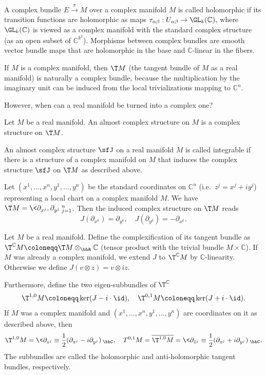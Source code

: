 \begin{defn}
    A complex bundle $E\overset\pi\to M$ over a complex manifold $M$ is called holomorphic if its transition functions are holomorphic as maps $\tau_{\alpha\beta}:U_{\alpha\beta}\to \GL_k(\mathbb{C})$, where $\GL_k(\mathbb{C})$ is viewed as a complex manifold with the standard complex structure (as an open subset of $\mathbb{C}^{k^2}$). Morphisms between complex bundles are smooth vector bundle maps that are holomorphic in the base and $\mathbb{C}$-linear in the fibers.
\end{defn}

If $M$ is a complex manifold, then $\T M$ (the tangent bundle of $M$ as a real manifold) is naturally a complex bundle, because the multiplication by the imaginary unit can be induced from the local trivializations mapping to $\mathbb{C}^n$.

However, when can a real manifold be turned into a complex one?

\begin{defn}
    Let $M$ be a real manifold. An almost complex structure on $M$ is a complex structure on $\T M$.
\end{defn}

\begin{defn}
    An almost complex structure $\sfJ$ on a real manifold $M$ is called integrable if there is a structure of a complex manifold on $M$ that induces the complex structure $\sfJ$ on $\T M$ as described above.
\end{defn}

Let $(x^1,\ldots,x^n,y^1,\ldots,y^n)$ be the standard coordinates on $\mathbb{C}^n$ (i.e.\ $z^j=x^j+iy^j$) representing a local chart on a complex manifold $M$. We have $\T M=\<\partial_{x^j},\partial_{y^j}\>_{j=1}^n$. Then the induced complex structure on $\T M$ reads 
\[J(\partial_{x^k})=\partial_{y^k},\quad J(\partial_{y^k})=-\partial_{x^k}.\]

\begin{defn}
    Let $M$ be a real manifold. Define the complexification of its tangent bundle as $\T^\mathbb{C} M\coloneqq \T M\otimes_\bbR \mathbb{C}$ (tensor product with the trivial bundle $M\times \mathbb{C}$). If $M$ was already a complex manifold, we extend $J$ to $\T^\mathbb{C} M$ by $\mathbb{C}$-linearity. Otherwise we define $J(v\otimes z)=v\otimes iz$.
    
    Furthermore, define the two eigen-subbundles of $\T^\mathbb{C}$
    \[\T^{1,0}M\coloneqq \ker(J-i\cdot \id),\quad \T^{0,1}M\coloneqq\ker(J+i\cdot\id).\]
    If $M$ was a complex manifold and $(x^1,\ldots,x^n,y^1,\ldots,y^n)$ are coordinates on it as described above, then 
    \[\T^{1,0}M=\<\partial_{z^j}\equiv \frac12(\partial_{x^j}-i\partial_{y^j})\>_\bbC,\quad T^{0,1}M=\overline{\T^{1,0}M}=\<\partial_{\bar z^j}\equiv \frac12(\partial_{x^j}+i\partial_{y^j})\>_\bbC.\]
    The subbundles are called the holomorphic and anti-holomorphic tangent bundles, respectively.
\end{defn}


